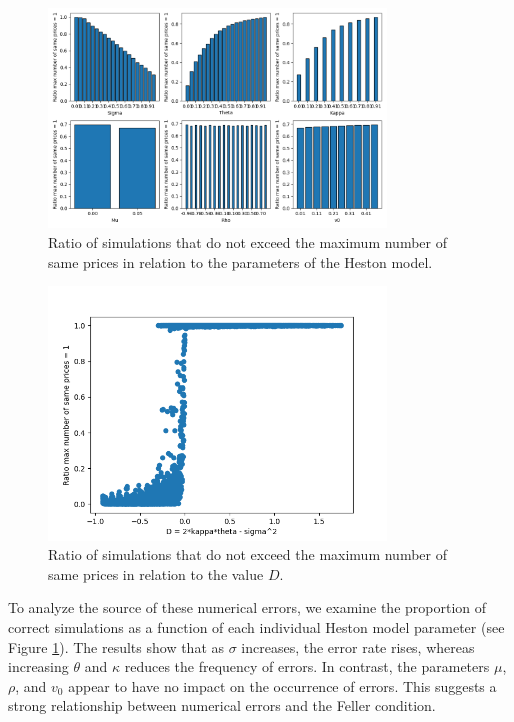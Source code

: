 \begin{figure}
    \centering
    \includegraphics[width=0.8\textwidth]{img/max_number_of_same_prices_ratio_parameters.png}
    \caption{Ratio of simulations that do not exceed the maximum number of same prices in relation to the parameters of the Heston model.}
    \label{fig:max_number_of_same_prices_ratio_parameters}
\end{figure}

\begin{figure}
    \centering
    \includegraphics[width=0.8\textwidth]{img/max_number_of_same_prices_ratio_feller_diff.png}
    \caption{Ratio of simulations that do not exceed the maximum number of same prices in relation to the value $D$.}
    \label{fig:max_number_of_same_prices_ratio_D}
\end{figure}

To analyze the source of these numerical errors, we examine the proportion of correct simulations as a function of each individual Heston model parameter (see Figure \ref{fig:max_number_of_same_prices_ratio_parameters}). The results show that as $\sigma$ increases, the error rate rises, whereas increasing $\theta$ and $\kappa$ reduces the frequency of errors. In contrast, the parameters $\mu$, $\rho$, and $v_0$ appear to have no impact on the occurrence of errors. This suggests a strong relationship between numerical errors and the Feller condition.

